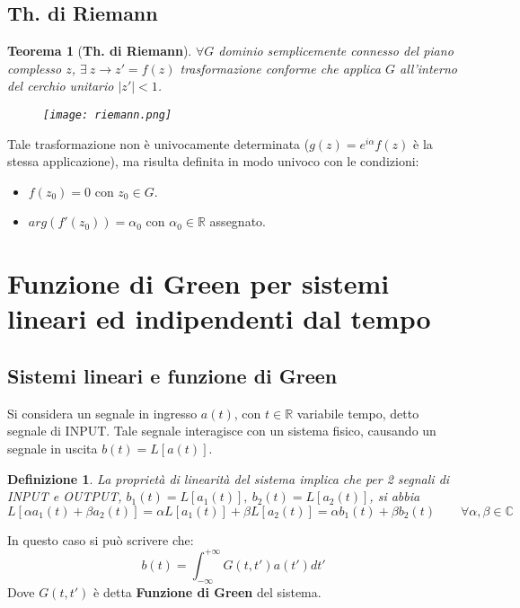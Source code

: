 \documentclass[twoside]{article}
\newtheorem{definition}{Definizione}[section]
\newtheorem{theorem}{Teorema}[section]
\begin{document}
\subsection{Th. di Riemann}
\begin{theorem}[\textbf{Th. di Riemann}]\label{Riemann}
$\forall G$ dominio semplicemente connesso del piano complesso $z$, $\exists \ z\to z'=f(z)$ trasformazione conforme che applica $G$ all'interno del cerchio unitario $|z'|<1$.
\begin{figure}[H]
\centering
\texttt{[image: riemann.png]}
\label{fig:riemann}
\end{figure}
\end{theorem}
Tale trasformazione non è univocamente determinata ($g(z)=e^{i\alpha}f(z)$ è la stessa applicazione), ma risulta definita in modo univoco con le condizioni:
\begin{itemize}
    \item $f(z_0)=0$ con $z_0 \in G$.
    \item $arg(f'(z_0))=\alpha_0$ con $\alpha_0 \in \mathds{R}$ assegnato.
\end{itemize}
























\newpage

\section{Funzione di Green per sistemi lineari ed indipendenti dal tempo}
\subsection{Sistemi lineari e funzione di Green}
Si considera un segnale in ingresso $a(t)$, con $t\in\mathds{R}$ variabile tempo, detto segnale di INPUT. Tale segnale interagisce con un sistema fisico, causando un segnale in uscita $b(t)=L[a(t)]$.\\
\begin{definition}
La proprietà di linearità del sistema implica che per 2 segnali di INPUT e OUTPUT,  $b_1(t)=L[a_1(t)],\ b_2(t)=L[a_2(t)]$, si abbia
\begin{equation}
    L[\alpha a_1(t)+\beta a_2(t)]=\alpha L[a_1(t)]+\beta L[a_2(t)]=\alpha b_1(t)+\beta b_2(t) \qquad \forall \alpha,\beta \in \mathds{C}
\end{equation}
\end{definition}
In questo caso si può scrivere che:
\begin{equation} \label{15 Green}
    b(t)=\int_{-\infty}^{+\infty}G(t,t')a(t')dt'
\end{equation}
Dove $G(t,t')$ è detta \textbf{Funzione di Green} del sistema.
\end{document}
